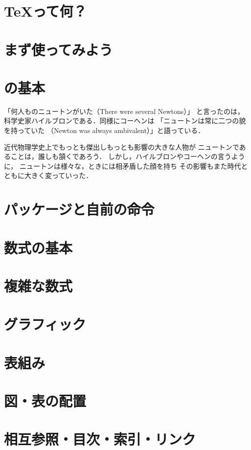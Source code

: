 \documentclass{jsbook}
\begin{document}
\chapter{\TeX って何？}

\chapter{まず使ってみよう}

\chapter{\LaTeXe の基本}

「何人ものニュートンがいた（There were several Newtons）」
と言ったのは，科学史家ハイルブロンである．同様にコーヘンは
「ニュートンは常に二つの貌を持っていた
（Newton was always ambivalent）」と語っている．

近代物理学史上でもっとも傑出しもっとも影響の大きな人物が
ニュートンであることは，誰しも頷くであろう．
しかし，ハイルブロンやコーヘンの言うように，
ニュートンは様々な，ときには相矛盾した顔を持ち
その影響もまた時代とともに大きく変っていった．

\chapter{パッケージと自前の命令}

\chapter{数式の基本}

\chapter{複雑な数式}

\chapter{グラフィック}

\chapter{表組み}

\chapter{図・表の配置}

\chapter{相互参照・目次・索引・リンク}
\end{document}
